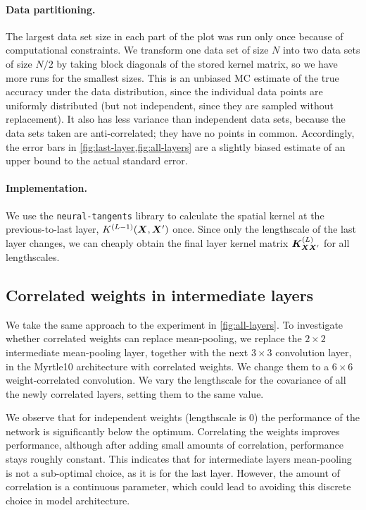 \documentclass[accepted]{uai2021} %
\newcommand{\covf}[1]{K\ssup{#1}}
\newcommand{\0}{\boldsymbol{0}}
\newcommand{\1}{\boldsymbol{1}}
\begin{document}
\paragraph{Data partitioning.} The largest data set size in each part of the plot was run only once because of computational constraints. We transform one data set of size $N$ into two data sets of size $N/2$ by taking block diagonals of the stored kernel matrix, so we have more runs for the smallest sizes. This is an unbiased \acl{MC} estimate of the true accuracy under the data distribution, since the individual data points are uniformly distributed (but not independent, since they are sampled without replacement). It also has less variance than independent data sets, because the data sets taken are anti-correlated; they have no points in common. Accordingly, the error bars in \cref{fig:last-layer,fig:all-layers} are a slightly biased estimate of an upper bound to the actual standard error.

\paragraph{Implementation.} We use the \texttt{neural-tangents} \citep{neuraltangents2020} library to calculate the spatial kernel at the previous-to-last layer, $\covf{L-1}\bra{\mX,\mX'}$ once.
Since only the lengthscale of the last layer changes, we can cheaply obtain the final layer kernel matrix ${\bm{K}}^{{\left( L \right)}}_{{\bm{X}}{\bm{X}}'}$ for all lengthscales.

\subsection{Correlated weights in intermediate layers}
We take the same approach to the experiment in \cref{fig:all-layers}. To investigate whether correlated weights can replace mean-pooling, we replace the $2\times 2$ intermediate mean-pooling layer, together with the next $3\times 3$ convolution layer, in the Myrtle10 architecture with correlated weights. We change them to a $6 \times 6$ weight-correlated convolution. We vary the lengthscale for the covariance of all the newly correlated layers, setting them to the same value.

We observe that for independent weights (lengthscale is 0) the performance of the network is significantly below the optimum. Correlating the weights improves performance, although after adding small amounts of correlation, performance stays roughly constant. This indicates that for intermediate layers mean-pooling is not a sub-optimal choice, as it is for the last layer. However, the amount of correlation is a continuous parameter, which could lead to avoiding this discrete choice in model architecture.
\end{document}
